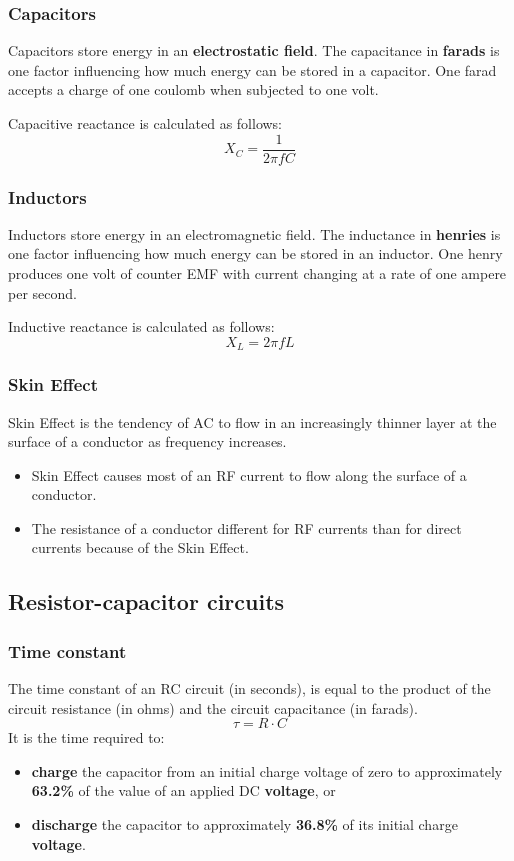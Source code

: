\documentclass[letterpaper]{article}
\begin{document}
        \subsubsection{Capacitors}
        Capacitors store energy in an \textbf{electrostatic field}.
        The capacitance in \textbf{farads} is one factor influencing how much energy can be stored in a capacitor.
        One farad accepts a charge of one coulomb when subjected to one volt.

        Capacitive reactance is calculated as follows:
        $$ X_C = \frac{1}{2 \pi f C} $$

        \subsubsection{Inductors}
        Inductors store energy in an electromagnetic field.
        The inductance in \textbf{henries} is one factor influencing how much energy can be stored in an inductor.
        One henry produces one volt of counter EMF with current changing at a rate of one ampere per second.

        Inductive reactance is calculated as follows:
        $$ X_L = 2 \pi f L $$

        \subsubsection{Skin Effect}
        Skin Effect is the tendency of AC to flow in an increasingly thinner layer at the surface of a conductor as frequency increases.

        \begin{itemize}
            \item Skin Effect causes most of an RF current to flow along the surface of a conductor.
            \item The resistance of a conductor different for RF currents than for direct currents because of the Skin Effect.
        \end{itemize}

        \newpage

        \subsection{Resistor-capacitor circuits}
        \subsubsection{Time constant}
        The time constant of an RC circuit (in seconds), is equal to the product of the circuit resistance (in ohms) and the circuit capacitance (in farads).
        $$ \tau = R \cdot C $$
        It is the time required to:
        \begin{itemize}
            \item \textbf{charge} the capacitor from an initial charge voltage of zero to approximately \textbf{63.2\%} of the value of an applied DC \textbf{voltage}, or
            \item \textbf{discharge} the capacitor to approximately \textbf{36.8\%} of its initial charge \textbf{voltage}.
        \end{itemize}
\end{document}
